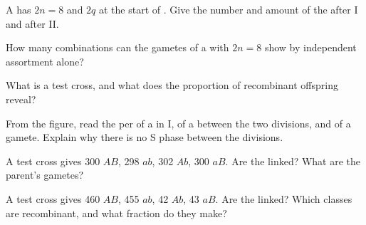 \begin{exercise}[$\star$]\label{exo:g12:meiosis-genetic-shuffling:3}
A  has $2n = 8$ and  $2q$ at the start of . Give the
 number and  amount of the  after  I and
after  II.
\end{exercise}

\begin{exercise}[$\star$]\label{exo:g12:meiosis-genetic-shuffling:4}
How many  combinations can the gametes of a  with
$2n = 8$ show by independent assortment alone?
\end{exercise}

\begin{exercise}[$\star$]\label{exo:g12:meiosis-genetic-shuffling:5}
What is a test cross, and what does the proportion of recombinant
offspring reveal?
\end{exercise}

\begin{exercise}[$\star\star$]\label{exo:g12:meiosis-genetic-shuffling:6}
From the  figure, read the  per  of a  in  I, of
a  between the two divisions, and of a gamete. Explain why there
is no S phase between the divisions.
\end{exercise}

\begin{exercise}[$\star\star$]\label{exo:g12:meiosis-genetic-shuffling:7}
A test cross gives 300 $AB$, 298 $ab$, 302 $Ab$, 300 $aB$. Are the
 linked? What are the parent's gametes?
\end{exercise}

\begin{exercise}[$\star\star$]\label{exo:g12:meiosis-genetic-shuffling:8}
A test cross gives 460 $AB$, 455 $ab$, 42 $Ab$, 43 $aB$. Are the 
linked? Which classes are recombinant, and what fraction do they make?
\end{exercise}

